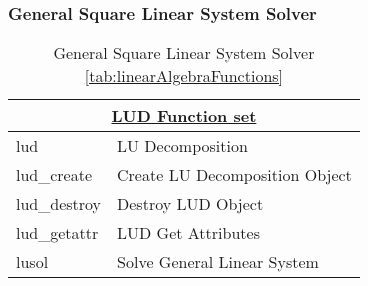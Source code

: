 \subsubsection*{General Square Linear System Solver} 
\begin{table}[H]
\caption{General Square Linear System Solver \ref{tab:linearAlgebraFunctions}}
\label{tab:generalSquareSolver}
\begin{center}
\begin{tabular}{|l|l|}
\multicolumn{2}{c}{\hyperlink{ludFunc}{\rmfamily \bfseries LUD Function set}}\\
\hline
lud & LU Decomposition\\
lud\_create & Create LU Decomposition Object \\
lud\_destroy & Destroy LUD Object \\
lud\_getattr & LUD Get Attributes\\
lusol & Solve General Linear System \\
\hline\end{tabular}
\end{center}
\label{default}
\end{table}%